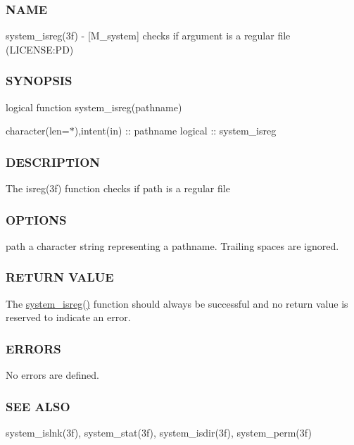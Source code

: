 \subsubsection*{N\+A\+ME}

system\+\_\+isreg(3f) -\/ \mbox{[}M\+\_\+system\mbox{]} checks if argument is a regular file (L\+I\+C\+E\+N\+SE\+:PD) 

\subsubsection*{S\+Y\+N\+O\+P\+S\+IS}

logical function system\+\_\+isreg(pathname)

character(len=$\ast$),intent(in) \+:\+: pathname logical \+:\+: system\+\_\+isreg

\subsubsection*{D\+E\+S\+C\+R\+I\+P\+T\+I\+ON}

The isreg(3f) function checks if path is a regular file

\subsubsection*{O\+P\+T\+I\+O\+NS}

path a character string representing a pathname. Trailing spaces are ignored.

\subsubsection*{R\+E\+T\+U\+RN V\+A\+L\+UE}

The \mbox{\hyperlink{namespacem__system_a127bdd84ccd4b52f3f29abbc56af029b}{system\+\_\+isreg()}} function should always be successful and no return value is reserved to indicate an error.

\subsubsection*{E\+R\+R\+O\+RS}

No errors are defined.

\subsubsection*{S\+EE A\+L\+SO}

system\+\_\+islnk(3f), system\+\_\+stat(3f), system\+\_\+isdir(3f), system\+\_\+perm(3f)

